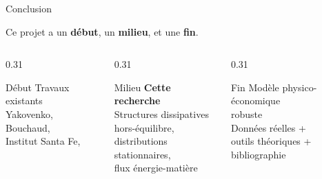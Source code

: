 \documentclass[aspectratio=169]{beamer}
\begin{document}
	\begin{frame}[t]{Conclusion}
		\vspace{-0.3em}%
		\begin{block}{}
			\centering\small
			Ce projet a un \textbf{début}, un \textbf{milieu}, et une \textbf{fin}.
		\end{block}
		\vspace{0.1em}%
		\begin{columns}[T]
			\begin{column}{0.31\textwidth}
				\begin{block}{\centering Début}
					\footnotesize\centering
					Travaux existants\\[0.2em]
					Yakovenko, Bouchaud,\\
					Institut Santa Fe,\\
				\end{block}
			\end{column}
			\begin{column}{0.31\textwidth}
				\begin{block}{\centering Milieu}
					\footnotesize\centering
					\textbf{Cette recherche}\\[0.2em]
					Structures dissipatives\\
					hors-équilibre,\\
					distributions stationnaires,\\
					flux énergie-matière
				\end{block}
			\end{column}
			\begin{column}{0.31\textwidth}
				\begin{block}{\centering Fin}
					\footnotesize\centering
					Modèle physico-économique\\
					robuste\\[0.2em]
					Données réelles +\\
					outils théoriques +\\
					bibliographie
				\end{block}
			\end{column}
		\end{columns}%
		

\end{frame}
\end{document}
